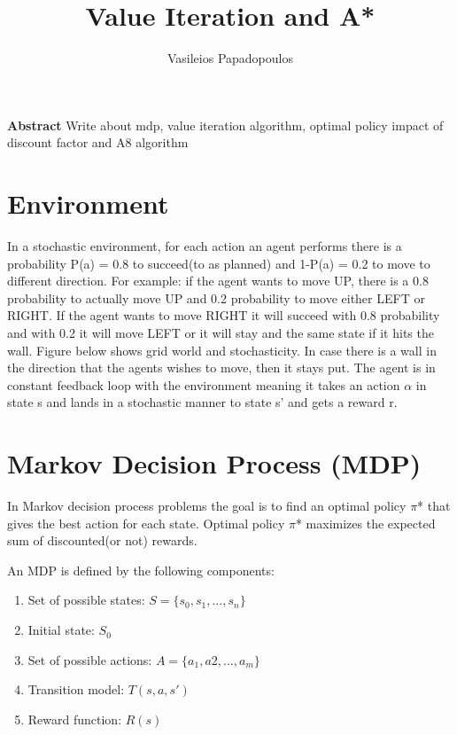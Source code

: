\documentclass[10pt,a4paper,twocolumn]{article}
\title{Value Iteration and A*}
\author{Vasileios Papadopoulos}
\begin{document}
	\maketitle
	
	\textbf{Abstract}
	Write about mdp, value iteration algorithm, optimal policy impact of discount factor and A8 algorithm
	
	
	
	\section{Environment}
	
	In a stochastic environment, for each action an agent performs there is a probability P(a) = 0.8 to succeed(to as planned) and 1-P(a) = 0.2 to move to different direction. For example: if the agent wants to move UP, there is a 0.8 probability to actually move UP and 0.2 probability to move either LEFT or RIGHT. If the agent wants to move RIGHT it will succeed with 0.8 probability and with 0.2 it will move LEFT or it will stay and the same state if it hits the wall. Figure below shows grid world and stochasticity.
	In case there is a wall in the direction that the agents wishes to move, then it stays put.
	The agent is in constant feedback loop with the environment meaning it takes an action $\alpha$ in state s and lands in a stochastic manner to state s’ and gets a reward r.
	
	\section{Markov Decision Process (MDP)}
	
	In Markov decision process problems the goal is to find an optimal policy $\pi$* that gives  the best action for each state. Optimal policy $\pi$* maximizes the expected sum of discounted(or not) rewards.
	
	An MDP is defined by the following components:
	\begin{enumerate}
		\item Set of possible states: $S = \{ s_{0}, s_{1}, ..., s_{n} \}$
		\item Initial state: $S_{0}$
		\item Set of possible actions: $A = \{ a_{1}, a{2}, ..., a_{m} \}$
		\item Transition model: $T(s, a, s')$
		\item Reward function: $R(s)$
	\end{enumerate}
\end{document}
